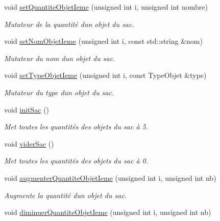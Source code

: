 \begin{DoxyCompactItemize}
void \hyperlink{class_sac_afa8ad056c3e5ac4de8daecc6d9772580}{set\+Quantite\+Objet\+Ieme} (unsigned int i, unsigned int nombre)
\begin{DoxyCompactList}\small\item\em Mutateur de la quantité d\textquotesingle{}un objet du sac. \end{DoxyCompactList}\item 
void \hyperlink{class_sac_a67fa840e9b489995f7df6a9ed2acdb48}{set\+Nom\+Objet\+Ieme} (unsigned int i, const std\+::string \&nom)
\begin{DoxyCompactList}\small\item\em Mutateur du nom d\textquotesingle{}un objet du sac. \end{DoxyCompactList}\item 
void \hyperlink{class_sac_a7b750145a41ee6598eba31d6568efa77}{set\+Type\+Objet\+Ieme} (unsigned int i, const Type\+Objet \&type)
\begin{DoxyCompactList}\small\item\em Mutateur du type d\textquotesingle{}un objet du sac. \end{DoxyCompactList}\item 
\mbox{\label{class_sac_a568f800ad7ed33cafc6351cd778ac017}} 
void \hyperlink{class_sac_a568f800ad7ed33cafc6351cd778ac017}{init\+Sac} ()
\begin{DoxyCompactList}\small\item\em Met toutes les quantités des objets du sac à 5. \end{DoxyCompactList}\item 
\mbox{\label{class_sac_af291d902c93e5157bcfa5d2f24bff291}} 
void \hyperlink{class_sac_af291d902c93e5157bcfa5d2f24bff291}{vider\+Sac} ()
\begin{DoxyCompactList}\small\item\em Met toutes les quantités des objets du sac à 0. \end{DoxyCompactList}\item 
void \hyperlink{class_sac_a1dee8b8525a1e9c00a8f0f3da5cdd4d2}{augmenter\+Quantite\+Objet\+Ieme} (unsigned int i, unsigned int nb)
\begin{DoxyCompactList}\small\item\em Augmente la quantité d\textquotesingle{}un objet du sac. \end{DoxyCompactList}\item 
void \hyperlink{class_sac_aac56c261612ca7c522ebee38644fbb98}{diminuer\+Quantite\+Objet\+Ieme} (unsigned int i, unsigned int nb)

\end{DoxyCompactItemize}
